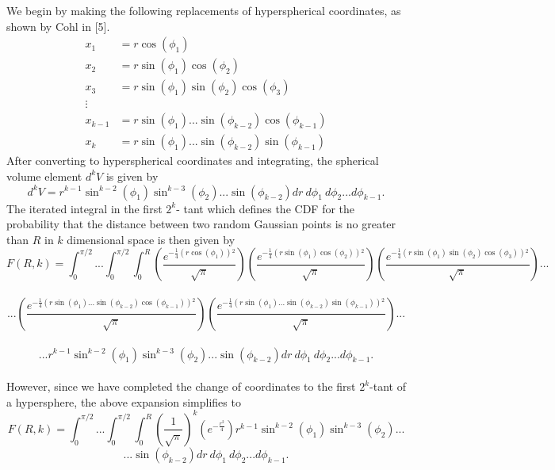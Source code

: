\documentclass[11pt]{article} %
\begin{document}
We begin by making the following replacements of hyperspherical coordinates, as shown by Cohl in [5].
\begin{align*}
x_1 &= r \cos\left(\phi_1\right) \\
x_2 &= r \sin\left(\phi_1\right)\cos\left(\phi_2\right) \\
x_3 &= r \sin\left(\phi_1\right)\sin\left(\phi_2\right)\cos\left(\phi_3\right) \\
\vdots \\
x_{k-1} &=  r \sin\left(\phi_1\right)...\sin\left(\phi_{k-2}\right)\cos\left(\phi_{k-1}\right) \\
x_k &=  r \sin\left(\phi_1\right)...\sin\left(\phi_{k-2}\right)\sin\left(\phi_{k-1}\right) 
\end{align*}
After converting to hyperspherical coordinates and integrating, the spherical volume element $d^k V$ is given by
$$d^k V = r^{k-1} \sin^{k-2}\left(\phi_1\right)\sin^{k-3}\left(\phi_2\right)...\sin\left(\phi_{k-2}\right) dr \  d\phi_1 \ d\phi_2 ... d\phi_{k-1}.$$
The iterated integral in the first $2^k$- tant which defines the CDF for the probability that the distance between two random Gaussian points is no greater than $R$ in $k$ dimensional space is then given by
$$F(R,k) = \int^{\pi/2}_0...\int^{\pi/2}_0\int^R_0 ( \frac{e^{-\frac{1}{4} (r \cos \left( \phi _1 \right) ){}^2}}{\sqrt{\pi}} ) ( \frac{e^{-\frac{1}{4} (r \sin \left( \phi _1 \right) \cos \left( \phi_2 \right) ){}^2}}{\sqrt{\pi}} )
( \frac{e^{-\frac{1}{4} (r \sin \left( \phi _1 \right) \sin \left( \phi_2 \right) \cos \left( \phi_3 \right) ){}^2}}{\sqrt{\pi}} ) ...$$ \\ 
$$...( \frac{e^{-\frac{1}{4} (r \sin \left( \phi _1 \right)...\sin \left( \phi_{k-2} \right) \cos \left( \phi_{k-1} \right) ){}^2}}{\sqrt{\pi}} )
( \frac{e^{-\frac{1}{4} (r \sin \left( \phi _1 \right)...\sin \left( \phi_{k-2} \right) \sin \left( \phi_{k-1} \right) ){}^2}}{\sqrt{\pi}} )... $$ \\
$$...r^{k-1} \sin^{k-2}\left(\phi_1\right)\sin^{k-3}\left(\phi_2\right)...\sin\left(\phi_{k-2}\right) dr \ d\phi_1 \ d\phi_2...d\phi_{k-1}.
 $$  \\
%
\indent However, since we have completed the change of coordinates to the first $2^k$-tant of a hypersphere, the above expansion simplifies to \\
$$F(R,k) = \int^{\pi/2}_0...\int^{\pi/2}_0\int^R_0 \left(\frac{1}{\sqrt{\pi}}\right)^k\left(e^{-\frac{r^2}{4}}\right)
r^{k-1} \sin^{k-2}\left(\phi_1\right)\sin^{k-3}\left(\phi_2\right)...$$
$$...\sin\left(\phi_{k-2}\right) dr \ d\phi_1 \ d\phi_2...d\phi_{k-1}.
$$
\end{document}
